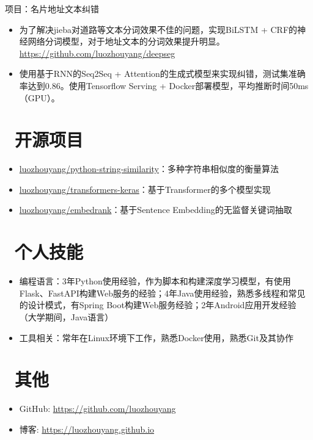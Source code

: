 \documentclass{resume}
\begin{document}
\begin{onehalfspacing}
项目：名片地址文本纠错
\begin{itemize}
  \item 为了解决jieba对道路等文本分词效果不佳的问题，实现BiLSTM + CRF的神经网络分词模型，对于地址文本的分词效果提升明显。\href{https://github.com/luozhouyang/deepseg}{https://github.com/luozhouyang/deepseg}
  \item 使用基于RNN的Seq2Seq + Attention的生成式模型来实现纠错，测试集准确率达到0.86。使用Tensorflow Serving + Docker部署模型，平均推断时间50ms（GPU）。
\end{itemize}
\end{onehalfspacing}


\section{\faCode\ 开源项目}
\begin{itemize}[parsep=0.5ex]
  \item \href{https://github.com/luozhouyang/python-string-similarity}{luozhouyang/python-string-similarity}：多种字符串相似度的衡量算法
  \item \href{https://github.com/luozhouyang/transformers-keras}{luozhouyang/transformers-keras}：基于Transformer的多个模型实现
 \item \href{https://github.com/luozhouyang/embedrank}{luozhouyang/embedrank}：基于Sentence Embedding的无监督关键词抽取
\end{itemize}

\section{\faCogs\ 个人技能}
\begin{itemize}[parsep=0.5ex]
  \item 编程语言：3年Python使用经验，作为脚本和构建深度学习模型，有使用Flask、FastAPI构建Web服务的经验；4年Java使用经验，熟悉多线程和常见的设计模式，有Spring Boot构建Web服务经验；2年Android应用开发经验（大学期间，Java语言）
 \item 工具相关：常年在Linux环境下工作，熟悉Docker使用，熟悉Git及其协作
\end{itemize}

\section{\faInfo\ 其他}
\begin{itemize}[parsep=0.5ex]
  \item GitHub: \href{https://github.com/luozhouyang}{https://github.com/luozhouyang}
  \item 博客\hspace{4mm}: \href{https://luozhouyang.github.io}{https://luozhouyang.github.io}
\end{itemize}

%
%
\end{document}
